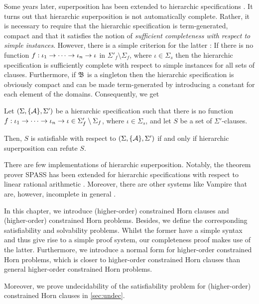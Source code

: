 \documentclass[a4paper,twoside,notitlepage,openright,11pt]{report}
\begin{document}
Some years later, superposition has been extended to hierarchic specifications \cite{BGW94}. It turns out that hierarchic superposition is not automatically complete. Rather, it is necessary to require that the hierarchic specification is term-generated, compact and  that it satisfies the notion of \emph{sufficient completeness with respect to simple instances}. However, there is a simple criterion for the latter \cite{BGW94}: If there is no function $f:\iota_1\to\cdots\to\iota_n\to\iota$ in $\Sigma'_f\setminus\Sigma_f$, where $\iota\in\Sigma_s$ then the hierarchic specification is sufficiently complete with respect to simple instances for all sets of clauses.
Furthermore, if $\mathfrak B$ is a singleton then the hierarchic specification is obviously compact and can be made term-generated by introducing a constant for each element of the domains. Consequently, we get
\begin{theorem}
  \label{thm:hiersuperpos}
  Let $(\Sigma,\{\mathcal A\},\Sigma')$ be a hierarchic specification such that there is no function $f:\iota_1\to\cdots\to\iota_n\to\iota\in\Sigma'_f\setminus\Sigma_f$, where $\iota\in\Sigma_s$, and let $S$ be a set of $\Sigma'$-clauses.

  Then, $S$ is satisfiable with respect to $(\Sigma,\{\mathcal A\},\Sigma')$ if and only if hierarchic superposition can refute $S$.
\end{theorem}
There are few implementations of hierarchic superposition.
Notably, the theorem prover SPASS has been extended for hierarchic specifications with respect to linear rational arithmetic \cite{AKW09,K13}. Moreover, there are other systems like Vampire that are, however, incomplete in general \cite{KV13}.


\label{ch:defHoCHC}
In this chapter, we introduce (higher-order) constrained Horn clauses and (higher-order) constrained Horn problems. Besides, we define the corresponding satisfiability and solvability problems. Whilst the former have a simple syntax and thus give rise to a simple proof system, our completeness proof makes use of the latter. Furthermore, we introduce a normal form for higher-order constrained Horn problems, which is closer to higher-order constrained Horn clauses than general higher-order constrained Horn problems.

Moreover, we prove undecidability of the satisfiability problem for (higher-order) constrained Horn clauses in \cref{sec:undec}.
\end{document}
